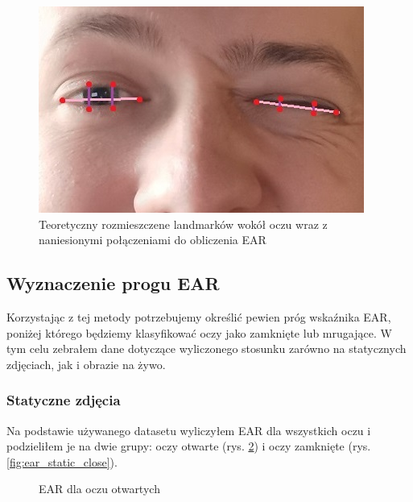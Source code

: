 \begin{figure}[!h]
    \begin{center}
        \includegraphics[scale=0.35]{img/landmark_section/theoretical_eye_landmarks.jpg}
        \caption{Teoretyczny rozmieszczene landmarków wokół oczu wraz z naniesionymi połączeniami do obliczenia EAR}
        \label{fig:theoretical_eye_landmarks}
    \end{center}
\end{figure}


\subsection{Wyznaczenie progu EAR}

Korzystając z tej metody potrzebujemy określić pewien próg wskaźnika EAR, poniżej którego będziemy klasyfikować oczy jako zamknięte lub mrugające. W tym celu zebrałem dane dotyczące wyliczonego stosunku zarówno na statycznych zdjęciach, jak i obrazie na żywo.

\subsubsection{Statyczne zdjęcia}

Na podstawie używanego datasetu wyliczyłem EAR dla wszystkich oczu i podzieliłem je na dwie grupy: oczy otwarte (rys. \ref{fig:ear_static_open}) i oczy zamknięte (rys. \ref{fig:ear_static_close}). 

\vspace{5mm}

\begin{figure}[!h]
    \centering
    \caption{EAR dla oczu otwartych}
    \label{fig:ear_static_open}
\end{figure}

